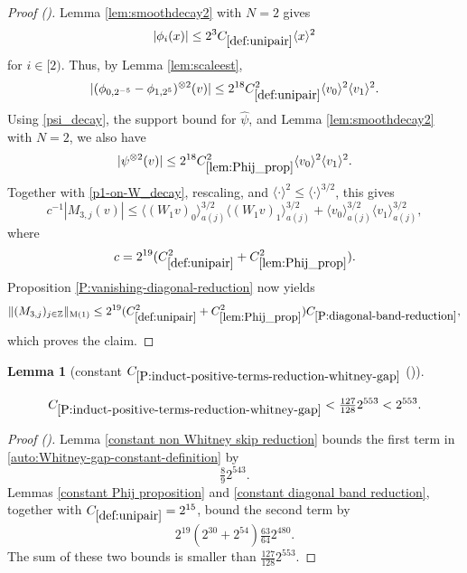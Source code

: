 \documentclass[12pt,reqno]{amsart}
\newcommand{\auto}{{({\tiny\faCar})}}
\theoremstyle{plain}
\newtheorem{lemma}[theorem]{Lemma}
\numberwithin{equation}{section}
\theoremstyle{remark}
\newcommand{\uses}[1]{}
\newcommand{\usesdefs}[1]{}
\newcommand{\leanok}{}
\newcommand{\lean}[1]{}
\newcommand{\Z}{{\mathbb Z}}
\begin{document}
\begin{proof}[Proof \auto]
Lemma \ref{lem:smoothdecay2} with $N=2$ gives
\[
|\phi_i(x)|\le2^3C_{\ref{def:unipair}}\langle x\rangle^2
\]
for $i\in[2)$. Thus, by Lemma \ref{lem:scaleest},
\[
|(\phi_{0,2^{-5}}-\phi_{1,2^5})^{\otimes2}(v)|
\le2^{18}C_{\ref{def:unipair}}^2\langle v_0\rangle^2\langle v_1\rangle^2.
\]
Using \eqref{psi_decay}, the support bound for $\widehat\psi$, and Lemma \ref{lem:smoothdecay2} with $N=2$, we also have
\begin{equation}\label{decay_2}
|\psi^{\otimes2}(v)|
\le2^{18}C_{\ref{lem:Phij_prop}}^2
\langle v_0\rangle^2\langle v_1\rangle^2.
\end{equation}
Together with \eqref{p1-on-W_decay}, rescaling, and $\langle\cdot\rangle^2\le\langle\cdot\rangle^{3/2}$, this gives
\[
c^{-1}|M_{3,j}(v)|
\le
\langle(W_1v)_0\rangle_{a(j)}^{3/2}
\langle(W_1v)_1\rangle_{a(j)}^{3/2}
+
\langle v_0\rangle_{a(j)}^{3/2}
\langle v_1\rangle_{a(j)}^{3/2},
\]
where
\[
c=2^{19}(C_{\ref{def:unipair}}^2+C_{\ref{lem:Phij_prop}}^2).
\]
Proposition \ref{P:vanishing-diagonal-reduction} now yields
\[
\|(M_{3,j})_{j\in\Z}\|_{\rm M(1)}
\le2^{19}(C_{\ref{def:unipair}}^2+C_{\ref{lem:Phij_prop}}^2)
C_{\ref{P:diagonal-band-reduction}},
\]
which proves the claim.
\end{proof}

\begin{lemma}[constant $C_{\ref{P:induct-positive-terms-reduction-whitney-gap}}$ \auto]\label{constant Whitney gap reduction}\uses{constant non Whitney skip reduction,P:induct-positive-terms-reduction-whitney-gap,constant Phij proposition,constant diagonal band reduction}\usesdefs{def:unipair}
\lean{Auto.constantWhitneyGapReduction}
\leanok
\begin{equation}\label{constant Whitney gap reduction bound}
C_{\ref{P:induct-positive-terms-reduction-whitney-gap}}
<\tfrac{127}{128}2^{553}<2^{553}.
\end{equation}
\end{lemma}
\begin{proof}[Proof \auto]
Lemma \ref{constant non Whitney skip reduction} bounds the first term in \eqref{auto:Whitney-gap-constant-definition} by
\[
\tfrac89 2^{543}.
\]
Lemmas \ref{constant Phij proposition} and \ref{constant diagonal band reduction}, together with $C_{\ref{def:unipair}}=2^{15}$, bound the second term by
\[
2^{19}(2^{30}+2^{54})\tfrac{63}{64}2^{480}.
\]
The sum of these two bounds is smaller than $\frac{127}{128}2^{553}$.
\end{proof}
\end{document}
